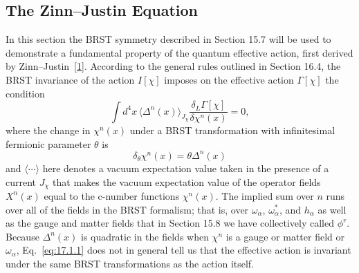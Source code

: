 \subsection{The Zinn--Justin Equation}

In this section the BRST symmetry described in Section 15.7 will be used to demonstrate a fundamental property of the quantum effective action, first derived by Zinn--Justin~\hyperref[ch17-ref-1]{[1]}. According to the general rules outlined in Section 16.4, the BRST invariance of the action $I[\chi]$ imposes on the effective action $\Gamma[\chi]$ the condition
\begin{equation}
\int d^4x\,\langle\Delta^n(x)\rangle_{J_\chi}
\frac{\delta_L\Gamma[\chi]}{\delta\chi^n(x)}=0,
\tag{17.1.1}\label{eq:17.1.1}
\end{equation}
where the change in $\chi^n(x)$ under a BRST transformation with infinitesimal fermionic parameter $\theta$ is
\begin{equation}
\delta_\theta\chi^n(x)=\theta\Delta^n(x)
\tag{17.1.2}\label{eq:17.1.2}
\end{equation}
and $\langle\cdots\rangle$ here denotes a vacuum expectation value taken in the presence of a current $J_\chi$ that makes the vacuum expectation value of the operator fields $X^n(x)$ equal to the c-number functions $\chi^n(x)$. The implied sum over $n$ runs over all of the fields in the BRST formalism; that is, over $\omega_\alpha$, $\omega_\alpha^*$, and $h_\alpha$ as well as the gauge and matter fields that in Section 15.8 we have collectively called $\phi^r$. Because $\Delta^n(x)$ is quadratic in the fields when $\chi^n$ is a gauge or matter field or $\omega_\alpha$, Eq.~\eqref{eq:17.1.1} does not in general tell us that the effective action is invariant under the same BRST transformations as the action itself.

